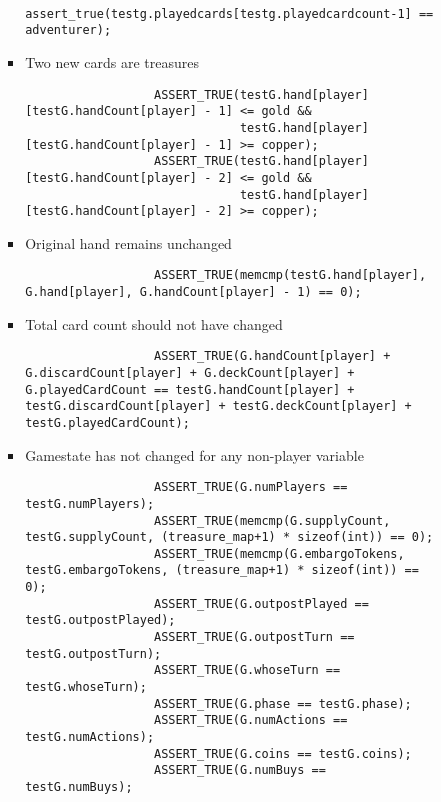 \documentclass[11pt,letterpaper]{article}
\begin{document}
\begin{enumerate}[label=\arabic*., leftmargin=*]
\begin{itemize}[leftmargin=*]
\begin{itemize}[leftmargin=*]
\begin{itemize}[leftmargin=*]
                  \begin{lstlisting}
                  assert_true(testg.playedcards[testg.playedcardcount-1] == adventurer);
                  \end{lstlisting}

              \item Two new cards are treasures
                  \begin{lstlisting}
                  ASSERT_TRUE(testG.hand[player][testG.handCount[player] - 1] <= gold && 
                              testG.hand[player][testG.handCount[player] - 1] >= copper);
                  ASSERT_TRUE(testG.hand[player][testG.handCount[player] - 2] <= gold && 
                              testG.hand[player][testG.handCount[player] - 2] >= copper);
                  \end{lstlisting}

              \item Original hand remains unchanged

                  \begin{lstlisting}
                  ASSERT_TRUE(memcmp(testG.hand[player], G.hand[player], G.handCount[player] - 1) == 0);
                  \end{lstlisting}
              \item Total card count should not have changed

                  \begin{lstlisting}
                  ASSERT_TRUE(G.handCount[player] + G.discardCount[player] + G.deckCount[player] + G.playedCardCount == testG.handCount[player] + testG.discardCount[player] + testG.deckCount[player] + testG.playedCardCount);
                  \end{lstlisting}

              \item Gamestate has not changed for any non-player variable

                  \begin{lstlisting}
                  ASSERT_TRUE(G.numPlayers == testG.numPlayers);
                  ASSERT_TRUE(memcmp(G.supplyCount, testG.supplyCount, (treasure_map+1) * sizeof(int)) == 0);
                  ASSERT_TRUE(memcmp(G.embargoTokens, testG.embargoTokens, (treasure_map+1) * sizeof(int)) == 0);
                  ASSERT_TRUE(G.outpostPlayed == testG.outpostPlayed);
                  ASSERT_TRUE(G.outpostTurn == testG.outpostTurn);
                  ASSERT_TRUE(G.whoseTurn == testG.whoseTurn);
                  ASSERT_TRUE(G.phase == testG.phase); 
                  ASSERT_TRUE(G.numActions == testG.numActions); 
                  ASSERT_TRUE(G.coins == testG.coins); 
                  ASSERT_TRUE(G.numBuys == testG.numBuys); 
                  \end{lstlisting}


\end{itemize}
\end{itemize}
\end{itemize}
\end{enumerate}
\end{document}
